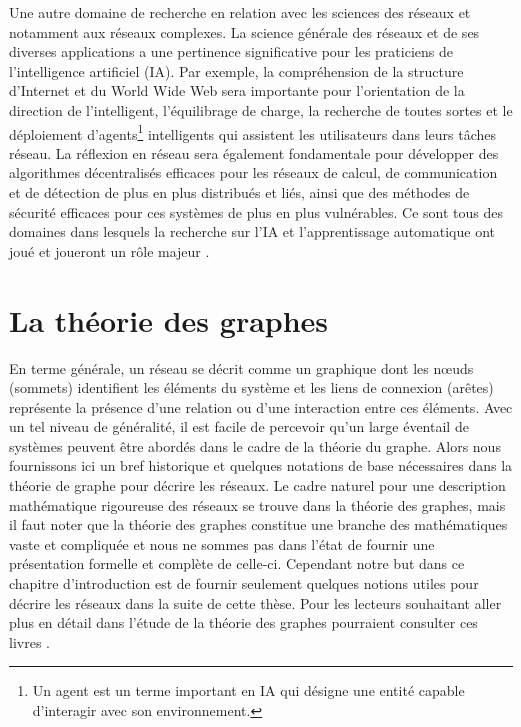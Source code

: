 Une autre domaine de recherche en relation avec les sciences des réseaux et notamment aux réseaux complexes. La science générale des réseaux et de ses diverses applications a une pertinence significative pour les praticiens de l'intelligence artificiel (IA). Par exemple, la compréhension de la structure d'Internet et du World Wide Web sera importante pour l'orientation de la direction de l'intelligent, l'équilibrage de charge, la recherche de toutes sortes et le déploiement d'agents\footnote{Un agent est un terme important en IA qui désigne une entité capable d’interagir avec
	son environnement.} intelligents qui assistent les utilisateurs dans leurs tâches réseau. La réflexion en réseau sera également fondamentale pour développer des algorithmes décentralisés efficaces pour les réseaux de calcul, de communication et de détection de plus en plus distribués et liés, ainsi que des méthodes de sécurité efficaces pour ces systèmes de plus en plus vulnérables. Ce sont tous des domaines dans lesquels la recherche sur l'IA et l'apprentissage automatique ont joué et joueront un rôle majeur \cite{Mitchell2006,Basheer-Hajmeerb2000,Passerini-al2017}.

\section{La théorie des graphes}
En terme générale, un réseau se décrit comme un graphique dont les nœuds (sommets) identifient les éléments du
système et les liens de connexion (arêtes) représente la présence d'une relation ou d'une interaction entre ces
éléments. Avec un tel niveau de généralité, il est facile de percevoir qu'un large éventail de systèmes peuvent être abordés
dans le cadre de la théorie du graphe. Alors nous fournissons ici un bref historique et quelques notations de base nécessaires
dans la théorie de graphe pour décrire les réseaux. Le cadre naturel pour une description mathématique rigoureuse des réseaux
se trouve dans la théorie des graphes, mais il faut noter que la théorie des graphes 
constitue une branche des mathématiques vaste et compliquée et nous ne sommes pas dans l'état de fournir une présentation formelle et complète de 
celle-ci. Cependant notre but dans ce chapitre d'introduction est de fournir seulement quelques notions utiles pour décrire 
les réseaux dans la suite de cette thèse. Pour les lecteurs souhaitant aller plus en détail dans l'étude de la théorie des graphes pourraient consulter ces livres \cite{Ha1995,West1996}.
